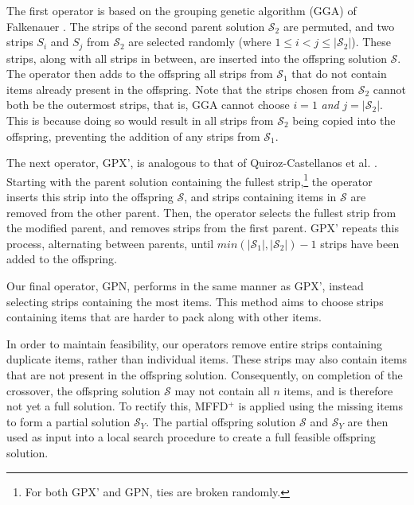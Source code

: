 \documentclass{elsarticle}
\begin{document}
The first operator is based on the grouping genetic algorithm (GGA) of Falkenauer \cite{falkenauer1992}. The strips of the second parent solution $\mathcal{S}_2$ are permuted, and two strips $S_i$ and $S_j$ from $\mathcal{S}_2$ are selected randomly (where $1 \leq i < j \leq |\mathcal{S}_2|$). These strips, along with all strips in between, are inserted into the offspring solution $\mathcal{S}$. The operator then adds to the offspring all strips from $\mathcal{S}_1$ that do not contain items already present in the offspring. Note that the strips chosen from $\mathcal{S}_2$ cannot both be the outermost strips, that is, GGA cannot choose $i = 1$ \emph{and} $j = |\mathcal{S}_2|$. This is because doing so would result in all strips from $\mathcal{S}_2$ being copied into the offspring, preventing the addition of any strips from $\mathcal{S}_1$.


The next operator, \alert{GPX'}, is analogous to that of Quiroz-Castellanos et al. \cite{quiroz2015}. Starting with the parent solution containing the fullest strip,\footnote{For both \alert{GPX'} and \alert{GPN}, ties are broken randomly.} the operator inserts this strip into the offspring $\mathcal{S}$, and strips containing items in $\mathcal{S}$ are removed from the other parent. Then, the operator selects the fullest strip from the modified parent, and removes strips from the first parent. GPX' repeats this process, alternating between parents, until $min (|\mathcal{S}_1|,|\mathcal{S}_2|) - 1$ strips have been added to the offspring.

Our final operator, \alert{GPN}, performs in the same manner as \alert{GPX'}, instead selecting strips containing the most items. This method aims to choose strips containing items that are harder to pack along with other items.

In order to maintain feasibility, our operators remove entire strips containing duplicate items, rather than individual items. These strips may also contain items that are not present in the offspring solution. Consequently, on completion of the crossover, the offspring solution $\mathcal{S}$ may not contain all $n$ items, and is therefore not yet a full solution. To rectify this, MFFD$^+$ is applied using the missing items to form a partial solution $\mathcal{S}_Y$. The partial offspring solution $\mathcal{S}$ and $\mathcal{S}_Y$ are then used as input into a local search procedure to create a full feasible offspring solution.
\end{document}
